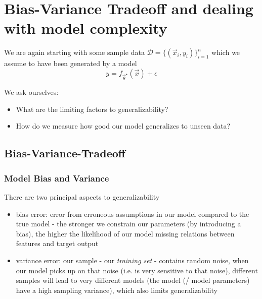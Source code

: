 \section{Bias-Variance Tradeoff and dealing with model complexity}
\thispagestyle{plain}

We are again starting with some sample data $\mathcal{D} = \{(\vec{x}_i, y_i)\}_{i=1}^n$
which we assume to have been generated by a model
\begin{equation}
    y = f_{\vec{\theta}^\star}(\vec{x}) + \epsilon
\end{equation}



We ask ourselves: 
\begin{itemize}
    \item What are the limiting factors to generalizability?
    \item How do we measure how good our model generalizes to unseen data?
\end{itemize}

\subsection{Bias-Variance-Tradeoff}

\subsubsection{Model Bias and Variance}
There are two principal aspects to generalizability
\begin{itemize}
    \item \textcolor{blue1}{bias error}: error from erroneous assumptions in our model compared to the true model - 
    the stronger we constrain our parameters (by introducing a bias), the higher the likelihood of our model missing
    relations between features and target output
    \item \textcolor{blue1}{variance error}: our sample - our \textit{training set} - contains random noise, when our
    model picks up on that noise (i.e. is very sensitive to that noise), different samples will lead to very different models (the model (/ model parameters)
    have a high sampling variance), which also limits generalizability
\end{itemize}

